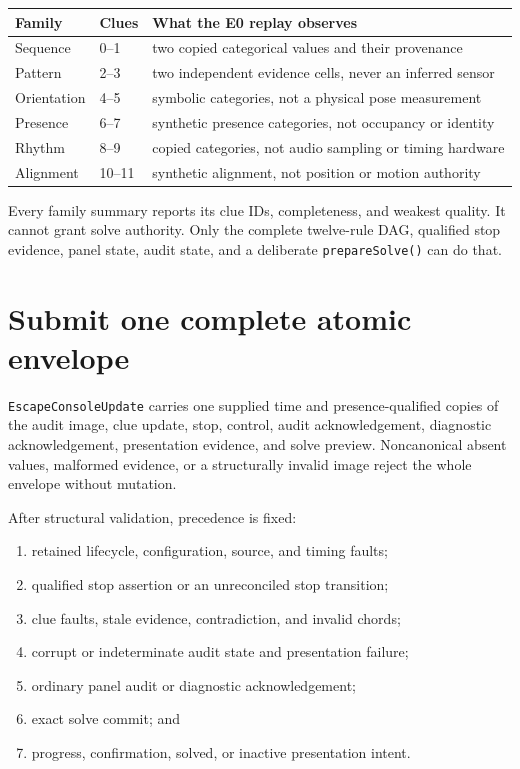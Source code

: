 \documentclass[10pt]{article}
\begin{document}
\begin{tabularx}{\linewidth}{@{}l l X@{}}
\toprule
Family & Clues & What the E0 replay observes\\
\midrule
Sequence & 0--1 & two copied categorical values and their provenance\\
Pattern & 2--3 & two independent evidence cells, never an inferred sensor\\
Orientation & 4--5 & symbolic categories, not a physical pose measurement\\
Presence & 6--7 & synthetic presence categories, not occupancy or identity\\
Rhythm & 8--9 & copied categories, not audio sampling or timing hardware\\
Alignment & 10--11 & synthetic alignment, not position or motion authority\\
\bottomrule
\end{tabularx}

Every family summary reports its clue IDs, completeness, and weakest quality.
It cannot grant solve authority. Only the complete twelve-rule DAG, qualified
stop evidence, panel state, audit state, and a deliberate
\texttt{prepareSolve()} can do that.

\section{Submit one complete atomic envelope}
\texttt{EscapeConsoleUpdate} carries one supplied time and presence-qualified
copies of the audit image, clue update, stop, control, audit acknowledgement,
diagnostic acknowledgement, presentation evidence, and solve preview.
Noncanonical absent values, malformed evidence, or a structurally invalid
image reject the whole envelope without mutation.

After structural validation, precedence is fixed:

\begin{enumerate}
 \item retained lifecycle, configuration, source, and timing faults;
 \item qualified stop assertion or an unreconciled stop transition;
 \item clue faults, stale evidence, contradiction, and invalid chords;
 \item corrupt or indeterminate audit state and presentation failure;
 \item ordinary panel audit or diagnostic acknowledgement;
 \item exact solve commit; and
 \item progress, confirmation, solved, or inactive presentation intent.
\end{enumerate}
\end{document}

